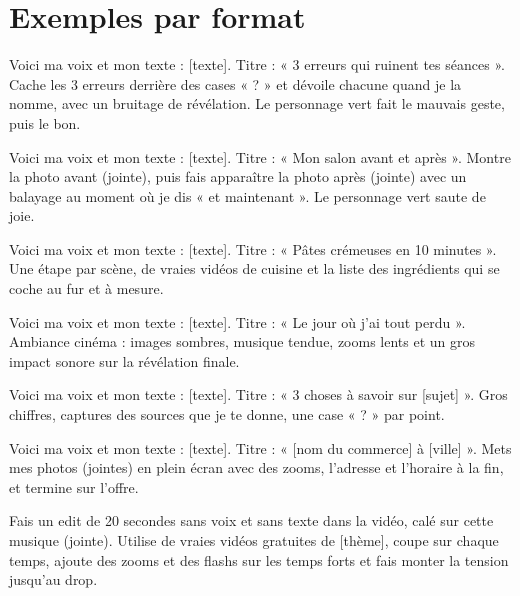 \documentclass[11pt,oneside,openany]{book}
\begin{document}
\section{Exemples par format}
\begin{acopier}
Voici ma voix et mon texte : [texte]. Titre : « 3 erreurs qui ruinent tes séances ». Cache les 3 erreurs derrière des cases « ? » et dévoile chacune quand je la nomme, avec un bruitage de révélation. Le personnage vert fait le mauvais geste, puis le bon.
\end{acopier}
\begin{acopier}
Voici ma voix et mon texte : [texte]. Titre : « Mon salon avant et après ». Montre la photo avant (jointe), puis fais apparaître la photo après (jointe) avec un balayage au moment où je dis « et maintenant ». Le personnage vert saute de joie.
\end{acopier}
\begin{acopier}
Voici ma voix et mon texte : [texte]. Titre : « Pâtes crémeuses en 10 minutes ». Une étape par scène, de vraies vidéos de cuisine et la liste des ingrédients qui se coche au fur et à mesure.
\end{acopier}
\begin{acopier}
Voici ma voix et mon texte : [texte]. Titre : « Le jour où j'ai tout perdu ». Ambiance cinéma : images sombres, musique tendue, zooms lents et un gros impact sonore sur la révélation finale.
\end{acopier}
\begin{acopier}
Voici ma voix et mon texte : [texte]. Titre : « 3 choses à savoir sur [sujet] ». Gros chiffres, captures des sources que je te donne, une case « ? » par point.
\end{acopier}
\begin{acopier}
Voici ma voix et mon texte : [texte]. Titre : « [nom du commerce] à [ville] ». Mets mes photos (jointes) en plein écran avec des zooms, l'adresse et l'horaire à la fin, et termine sur l'offre.
\end{acopier}
\begin{acopier}
Fais un edit de 20 secondes sans voix et sans texte dans la vidéo, calé sur cette musique (jointe). Utilise de vraies vidéos gratuites de [thème], coupe sur chaque temps, ajoute des zooms et des flashs sur les temps forts et fais monter la tension jusqu'au drop.
\end{acopier}
\end{document}
